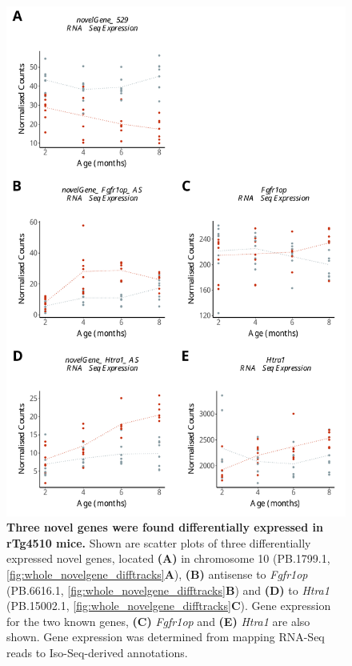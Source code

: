 \begin{figure}[!htp]
	\begin{center}
		\includegraphics[page=1,scale = 0.55]{Figures/NovelGeneExp.pdf}
	\end{center}
	\captionsetup{width=0.95\textwidth}
	\caption[Differentially expressed novel genes associated with progressive tau pathology]%
	{\textbf{Three novel genes were found differentially expressed in rTg4510 mice.} Shown are scatter plots of three differentially expressed novel genes, located \textbf{(A)} in chromosome 10 (PB.1799.1, \cref{fig:whole_novelgene_difftracks}\textbf{A}), \textbf{(B)} antisense to \textit{Fgfr1op} (PB.6616.1, \cref{fig:whole_novelgene_difftracks}\textbf{B}) and \textbf{(D)} to \textit{Htra1} (PB.15002.1, \cref{fig:whole_novelgene_difftracks}\textbf{C}). Gene expression for the two known genes, \textbf{(C)} \textit{Fgfr1op} and \textbf{(E)} \textit{Htra1} are also shown. Gene expression was determined from mapping RNA-Seq reads to Iso-Seq-derived annotations.}   
	\label{fig:whole_novelgene_diffexp}
\end{figure}

